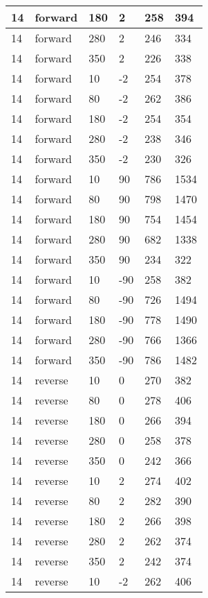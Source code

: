 \begin{table}
\begin{center}
\begin{tabular}{|l|l|l|l|l|l|}
			\hline
			14 & forward & 180 & 2 & 258 & 394 \\
			\hline
			14 & forward & 280 & 2 & 246 & 334 \\
			\hline
			14 & forward & 350 & 2 & 226 & 338 \\
			\hline
			14 & forward & 10 & -2 & 254 & 378 \\
			\hline
			14 & forward & 80 & -2 & 262 & 386 \\
			\hline
			14 & forward & 180 & -2 & 254 & 354 \\
			\hline
			14 & forward & 280 & -2 & 238 & 346 \\
			\hline
			14 & forward & 350 & -2 & 230 & 326 \\
			\hline
			14 & forward & 10 & 90 & 786 & 1534 \\
			\hline
			14 & forward & 80 & 90 & 798 & 1470 \\
			\hline
			14 & forward & 180 & 90 & 754 & 1454 \\
			\hline
			14 & forward & 280 & 90 & 682 & 1338 \\
			\hline
			14 & forward & 350 & 90 & 234 & 322 \\
			\hline
			14 & forward & 10 & -90 & 258 & 382 \\
			\hline
			14 & forward & 80 & -90 & 726 & 1494 \\
			\hline
			14 & forward & 180 & -90 & 778 & 1490 \\
			\hline
			14 & forward & 280 & -90 & 766 & 1366 \\
			\hline
			14 & forward & 350 & -90 & 786 & 1482 \\
			\hline
			14 & reverse & 10 & 0 & 270 & 382 \\
			\hline
			14 & reverse & 80 & 0 & 278 & 406 \\
			\hline
			14 & reverse & 180 & 0 & 266 & 394 \\
			\hline
			14 & reverse & 280 & 0 & 258 & 378 \\
			\hline
			14 & reverse & 350 & 0 & 242 & 366 \\
			\hline
			14 & reverse & 10 & 2 & 274 & 402 \\
			\hline
			14 & reverse & 80 & 2 & 282 & 390 \\
			\hline
			14 & reverse & 180 & 2 & 266 & 398 \\
			\hline
			14 & reverse & 280 & 2 & 262 & 374 \\
			\hline
			14 & reverse & 350 & 2 & 242 & 374 \\
			\hline
			14 & reverse & 10 & -2 & 262 & 406 \\

\end{tabular}
\end{center}
\end{table}
